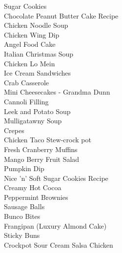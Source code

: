 \documentclass[11pt, twoside, openany]{book}
\begin{document}
Sugar Cookies\hrulefill\pageref{sugar-cookies}\\
Chocolate Peanut Butter Cake Recipe\hrulefill\pageref{chocolate-peanut-butter-cake-recipe}\\
Chicken Noodle Soup\hrulefill\pageref{chicken-noodle-soup}\\
Chicken Wing Dip\hrulefill\pageref{chicken-wing-dip}\\
Angel Food Cake\hrulefill\pageref{angel-food-cake}\\
Italian Christmas Soup\hrulefill\pageref{italian-christmas-soup}\\
Chicken Lo Mein\hrulefill\pageref{chicken-lo-mein}\\
Ice Cream Sandwiches\hrulefill\pageref{ice-cream-sandwiches}\\
Crab Casserole\hrulefill\pageref{crab-casserole}\\
Mini Cheesecakes - Grandma Dunn\hrulefill\pageref{mini-cheesecakes---grandma-dunn}\\
Cannoli Filling\hrulefill\pageref{cannoli-filling}\\
Leek and Potato Soup\hrulefill\pageref{leek-and-potato-soup}\\
Mulligatawny Soup\hrulefill\pageref{mulligatawny-soup}\\
Crepes\hrulefill\pageref{crepes}\\
Chicken Taco Stew-crock pot\hrulefill\pageref{chicken-taco-stew-crock-pot}\\
Fresh Cranberry Muffins\hrulefill\pageref{fresh-cranberry-muffins}\\
Mango Berry Fruit Salad\hrulefill\pageref{mango-berry-fruit-salad}\\
Pumpkin Dip\hrulefill\pageref{pumpkin-dip}\\
Nice 'n' Soft Sugar Cookies Recipe\hrulefill\pageref{nice-'n'-soft-sugar-cookies-recipe}\\
Creamy Hot Cocoa\hrulefill\pageref{creamy-hot-cocoa}\\
Peppermint Brownies\hrulefill\pageref{peppermint-brownies}\\
Sausage Balls\hrulefill\pageref{sausage-balls}\\
Bunco Bites\hrulefill\pageref{bunco-bites}\\
Frangipan (Luxury Almond Cake)\hrulefill\pageref{frangipan-(luxury-almond-cake)}\\
Sticky Buns\hrulefill\pageref{sticky-buns}\\
Crockpot Sour Cream Salsa Chicken\hrulefill\pageref{crockpot-sour-cream-salsa-chicken}\\
\end{document}
